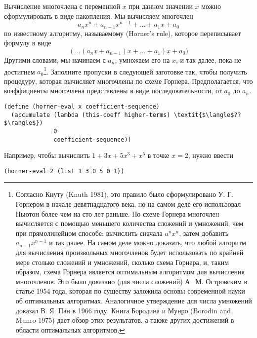 \begin{exercise}{2.34}\label{EX2.34}%
Вычисление многочлена с переменной $x$ при
данном значении $x$ можно сформулировать в виде
накопления.  Мы вычисляем многочлен
$$
        a_n x^n + a_{n-1} x^{n-1} + \ldots + a_1 x + a_0
$$
по известному алгоритму, называемому 
 (Horner's rule),
которое переписывает формулу в виде
$$
        (\ldots(a_n x + a_{n-1}) x + \ldots + a_1) x + a_0)
$$
Другими словами, мы начинаем с $a_n$, умножаем его на
$x$, и так далее, пока не достигнем $a_0$\footnote{Согласно Кнуту
  (Knuth 1981),
это правило было сформулировано  У. Г. Горнером в начале девятнадцатого века, но на самом
деле его использовал  Ньютон более чем на сто лет раньше.  По схеме
Горнера многочлен вычисляется с помощью меньшего количества сложений и
умножений,
чем при прямолинейном способе: вычислить сначала $a^n x^n$,
затем добавить $a_{n-1} x^{n-1}$ и так далее.  На самом
деле можно доказать, что любой алгоритм для вычисления произвольных
многочленов будет использовать по крайней мере столько сложений и
умножений, сколько схема Горнера, и, таким образом, схема Горнера
является 
оптимальным алгоритмом для вычисления многочленов.  Это было 
доказано (для числа сложений)  А.~М. Островским
в статье 1954 года, которая по
существу заложила основы современной науки об оптимальных алгоритмах.
Аналогичное утверждение для числа умножений доказал
В. Я. Пан 
в 1966 году.  Книга Бородина и Мунро
(Borodin and Munro 1975)
дает обзор этих результатов, а также других достижений в области
оптимальных алгоритмов.}.
Заполните пропуски в следующей заготовке так, чтобы получить
процедуру, которая вычисляет многочлены по схеме Горнера.
Предполагается, что коэффициенты многочлена представлены в виде
последовательности, от $a_0$ до $a_n$.

\begin{Verbatim}[fontsize=\small]
(define (horner-eval x coefficient-sequence)
  (accumulate (lambda (this-coeff higher-terms) \textit{$\langle$??$\rangle$})
              0
              coefficient-sequence))
\end{Verbatim}
Например, чтобы вычислить $1 + 3x + 5x^3 + x^5$ в точке
$x = 2$, нужно ввести

\begin{Verbatim}[fontsize=\small]
(horner-eval 2 (list 1 3 0 5 0 1))
\end{Verbatim}
\end{exercise}
